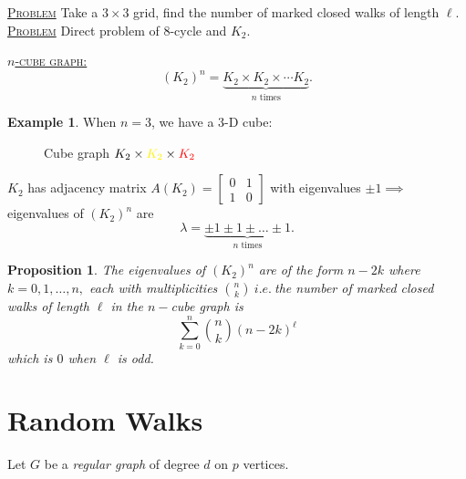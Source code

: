 \documentclass{report}
\newcommand{\ie}{\ i.e.\ }
\newcommand{\fancyem}[1]{\underline{\textsc{#1}}}
\newtheorem{proposition}{Proposition}[section]
\theoremstyle{definition}
\newtheorem{example}{Example}[section]
\theoremstyle{remark}
\numberwithin{equation}{section}
\begin{document}
\fancyem{Problem}
Take a $3 \times 3$ grid, find the number of marked closed walks of length $\ell.$\\
\fancyem{Problem}
Direct problem of $8$-cycle and $K_2.$



\fancyem{$n$-cube graph:}
\[(K_2)^n = \underbrace{K_2 \times K_2 \times \cdots K_2}_\text{$n$ times}.\]

\begin{example}
When $n = 3$, we have a $3$-D cube:
\begin{figure}[h]
\centering
{}
\label{fig:cube}
\caption{Cube graph $K_2 \times \color{yellow} K_2 \color{black} \times \color{red} K_2$ }
\end{figure}
\end{example}

$K_2$ has adjacency matrix $A(K_2) = \begin{bmatrix}
0 & 1 \\ 1 & 0
\end{bmatrix}$ with eigenvalues $\pm 1 \implies$ eigenvalues of $(K_2)^n$ are
\[
\lambda = \underbrace{\pm 1 \pm 1 \pm \ldots \pm 1}_\text{$n$ times}.
\]

\begin{proposition}
The eigenvalues of $(K_2)^n$ are of the form $n - 2k$ where $k = 0, 1, \ldots, n,$ each with multiplicities $\binom{n}{k} \ie$the number of marked closed walks of length $\ell$ in the $n-$cube graph is
\[\sum_{k = 0}^n \binom{n}{k} (n - 2k)^\ell\]
which is $0$ when $\ell$ is odd.
\end{proposition}

\section{Random Walks}
Let $G$ be a \emph{regular graph} of degree $d$ on $p$ vertices.
\end{document}
